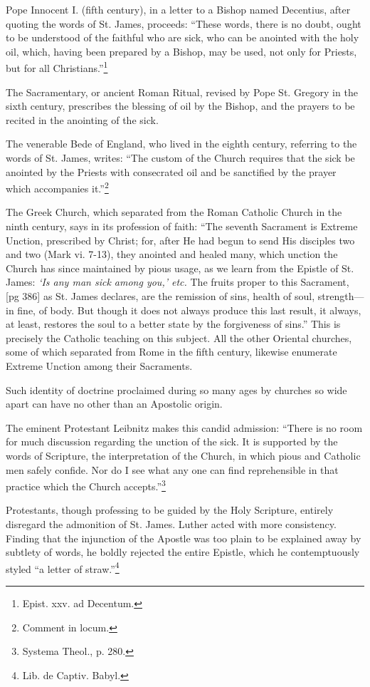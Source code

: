 Pope Innocent I. (fifth century), in a letter to a
Bishop named Decentius, after quoting the words
of St. James, proceeds: “These words, there is no
doubt, ought to be understood of the faithful who
are sick, who can be anointed with the holy oil,
which, having been prepared by a Bishop, may be
used, not only for Priests, but for all Christians.”\footnote{Epist.
xxv. ad Decentum.}

The Sacramentary, or ancient Roman Ritual, revised
by Pope St. Gregory in the sixth century,
prescribes the blessing of oil by the Bishop, and
the prayers to be recited in the anointing of the
sick.

The venerable Bede of England, who lived in
the eighth century, referring to the words of St.
James, writes: “The custom of the Church requires
that the sick be anointed by the Priests with
consecrated oil and be sanctified by the prayer
which accompanies it.”\footnote{Comment in locum.}

The Greek Church, which separated from the
Roman Catholic Church in the ninth century, says
in its profession of faith: “The seventh Sacrament
is Extreme Unction, prescribed by Christ;
for, after He had begun to send His disciples two
and two (Mark vi. 7-13), they anointed and healed
many, which unction the Church has since maintained
by pious usage, as we learn from the
Epistle of St. James: \emph{‘Is any man sick among
you,’ etc.} The fruits proper to this Sacrament,
[pg 386]
as St. James declares, are the remission of sins,
health of soul, strength—in fine, of body. But
though it does not always produce this last result,
it always, at least, restores the soul to a better
state by the forgiveness of sins.” This is precisely
the Catholic teaching on this subject. All
the other Oriental churches, some of which separated
from Rome in the fifth century, likewise enumerate
Extreme Unction among their Sacraments.

Such identity of doctrine proclaimed during so
many ages by churches so wide apart can have no
other than an Apostolic origin.

The eminent Protestant Leibnitz makes this
candid admission: “There is no room for much
discussion regarding the unction of the sick. It
is supported by the words of Scripture, the interpretation
of the Church, in which pious and Catholic
men safely confide. Nor do I see what any
one can find reprehensible in that practice which
the Church accepts.”\footnote{Systema Theol., p. 280.}

Protestants, though professing to be guided by
the Holy Scripture, entirely disregard the admonition
of St. James. Luther acted with more consistency.
Finding that the injunction of the Apostle
was too plain to be explained away by subtlety
of words, he boldly rejected the entire Epistle,
which he contemptuously styled “a letter of
straw.”\footnote{Lib. de Captiv. Babyl.}

